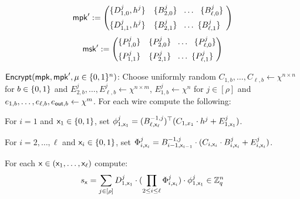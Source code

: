 {\begin{multicols}{2}
\begin{equation*}
    {\mathsf{mpk}}':=\left(  
         \begin{split} \{ D_{1,0}^j,h^j\}~&~~\{ B_{2,0}^j\}~~\ldots~~\{ B_{\ell,0}^j\} \\
       \{ D_{1,1}^j,h^j\}~&~~\{ B_{2,1}^j\}~~\ldots~\{ B_{\ell,1}^j\}~~ 
               \end{split}
    \right)
    \end{equation*}\break    
    \begin{equation*}
    {\mathsf{msk}}':=\left(  
         \begin{split}\{  P_{1,0}^j\}~&~~\{ P_{2,0}^j\}~~\ldots~~\{ P_{\ell,0} ^j\}\\
      \{   P_{1,1}^j\}~&~~\{ P_{2,1}^j\}~~\ldots~\{ P_{\ell,1}^j\}~    
               \end{split}
    \right)
    \end{equation*}
\end{multicols}



\item ${\mathsf{Encrypt}}({\mathsf{mpk}},{\mathsf{mpk}}',\mu\in\{0,1\}^n)$: Choose uniformly random $C_{1,b},\ldots, C_{\ell,b}  \leftarrow \chi^{n\times n}$ for $b\in\{0,1\}$ and $E_{2,b}^j,\ldots,E_{\ell,b}^j\leftarrow\chi^{n\times m}$, $E_{1,b}^j\leftarrow\chi^{n}$ for $j\in[\rho]$ and $e_{1,b},\ldots,e_{\ell,b},e_{\mathsf{out},b}\leftarrow\chi^{m}$. For each wire compute the following: 

\BI
\item For $i =1$ and $\mathsf{x}_1\in\{0,1\}$, set $\phi_{1,\mathsf{x}_1}^j=(B_{\ell,\mathsf{x}_\ell}^{-1,j})^\top (C_{1,x_1} \cdot h^j+E_{1,\mathsf{x}_1}^j)$. %
\item For $i =2,\ldots,\ell$ and $\mathsf{x}_i\in\{0,1\}$, set $\Phi_{i,\mathsf{x}_i}^j=B_{i-1,\mathsf{x}_{i-1}}^{-1,j}\cdot (C_{i,\mathsf{x}_i}\cdot B_{i,\mathsf{x}_i}^j+E_{i,\mathsf{x}_i}^j)$.

\item For each $\mathsf{x}\in(\mathsf{x}_1,\ldots,\mathsf{x}_\ell)$ compute: $$s_{\mathsf{x}}=\sum_{j\in[\rho]}D^j_{1,\mathsf{x}_1}\cdot (\prod_{2\leq i\leq \ell}\Phi_{i,\mathsf{x}_i}^j)\cdot \phi_{1,\mathsf{x}_1}^j \in \mathbb{Z}_q^n$$


}
